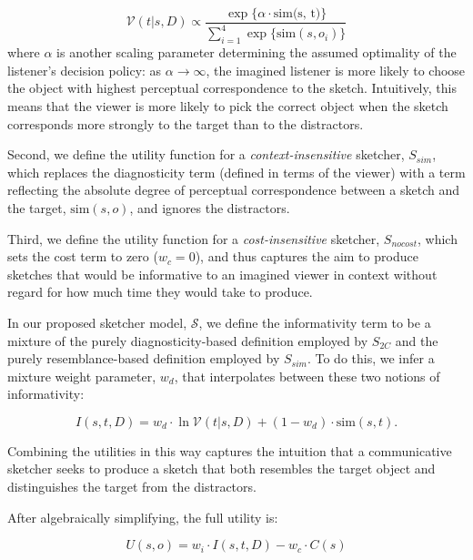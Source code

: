 \documentclass[9pt,twocolumn,twoside]{pnas-new}
\begin{document}
\begin{equation} \label{literal_viewer_score}
\mathcal{V}(t|s,D) \propto \frac {\exp\{\alpha \cdot \textrm{sim(s, t)}\}} {\sum_{i=1}^{4} \exp\{\textrm{sim}(s,o_i)\}}
\end{equation}
where $\alpha$ is another scaling parameter determining the assumed optimality of the listener's decision policy: as $\alpha \rightarrow \infty$, the imagined listener is more likely to choose the object with highest perceptual correspondence to the sketch. Intuitively, this means that the viewer is more likely to pick the correct object when the sketch corresponds more strongly to the target than to the distractors. 

Second, we define the utility function for a \textit{context-insensitive} sketcher, $S_{sim}$, which replaces the diagnosticity term (defined in terms of the viewer) with a  term reflecting the absolute degree of perceptual correspondence between a sketch and the target, $\textrm{sim}(s,o)$, and ignores the distractors. 

Third, we define the utility function for a \textit{cost-insensitive} sketcher, $S_{nocost}$, which sets the cost term to zero ($w_c=0$), and thus captures the aim to produce sketches that would be informative to an imagined viewer in context without regard for how much time they would take to produce. 

In our proposed sketcher model, $\mathcal{S}$, we define the informativity term to be a mixture of the purely diagnosticity-based definition employed by $S_{2C}$ and the purely resemblance-based definition employed by $S_{sim}$. 
To do this, we infer a mixture weight parameter, $w_{d}$, that interpolates between these two notions of informativity: 

\begin{equation} \label{prag_interpolation}
I(s,t,D) = w_{d} \cdot \ln \mathcal{V}(t|s,D) + (1-w_{d}) \cdot \textrm{sim}(s,t). 
\end{equation} 

Combining the utilities in this way captures the intuition that a communicative sketcher seeks to produce a sketch that both resembles the target object and distinguishes the target from the distractors.

After algebraically simplifying, the full utility is:

\begin{equation}
U(s,o) =  w_i \cdot  I(s,t,D) - w_c \cdot C(s)
\end{equation}
\end{document}
